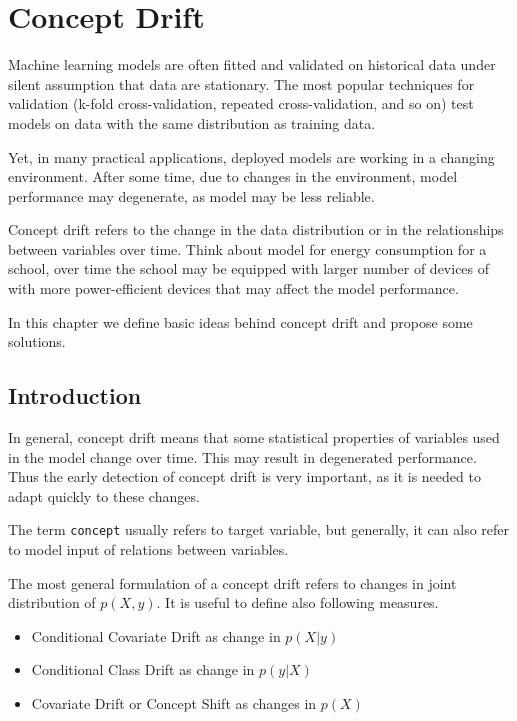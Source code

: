 \documentclass[12pt,]{krantz}
\providecommand{\tightlist}{%
  \setlength{\itemsep}{0pt}\setlength{\parskip}{0pt}}
\begin{document}
\hypertarget{conceptDrift}{%
\section{Concept Drift}\label{conceptDrift}}

Machine learning models are often fitted and validated on historical data under silent assumption that data are stationary. The most popular techniques for validation (k-fold cross-validation, repeated cross-validation, and so on) test models on data with the same distribution as training data.

Yet, in many practical applications, deployed models are working in a changing environment. After some time, due to changes in the environment, model performance may degenerate, as model may be less reliable.

Concept drift refers to the change in the data distribution or in the relationships between variables over time. Think about model for energy consumption for a school, over time the school may be equipped with larger number of devices of with more power-efficient devices that may affect the model performance.

In this chapter we define basic ideas behind concept drift and propose some solutions.

\hypertarget{introduction-2}{%
\subsection{Introduction}\label{introduction-2}}

In general, concept drift means that some statistical properties of variables used in the model change over time. This may result in degenerated performance. Thus the early detection of concept drift is very important, as it is needed to adapt quickly to these changes.

The term \texttt{concept} usually refers to target variable, but generally, it can also refer to model input of relations between variables.

The most general formulation of a concept drift refers to changes in joint distribution of \(p(X, y)\). It is useful to define also following measures.

\begin{itemize}
\tightlist
\item
  Conditional Covariate Drift as change in \(p(X | y)\)
\item
  Conditional Class Drift as change in \(p(y | X)\)
\item
  Covariate Drift or Concept Shift as changes in \(p(X)\)
\end{itemize}
\end{document}
